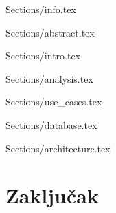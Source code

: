 \documentclass[a4paper]{article}
\begin{document}
 {Sections/info.tex}
\maketitle

 {Sections/abstract.tex}

\tableofcontents

\newpage

 {Sections/intro.tex}

 {Sections/analysis.tex}

 {Sections/use_cases.tex}

 {Sections/database.tex}

 {Sections/architecture.tex}



\section{Zaključak}
\label{sec:zakljucak}


\appendix
 

\end{document}
